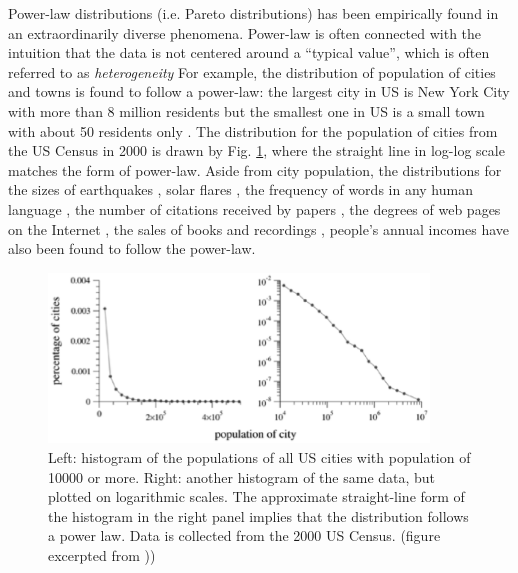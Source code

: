 Power-law distributions (i.e. Pareto distributions) has been empirically found in an extraordinarily diverse phenomena. Power-law is often connected with the intuition that the data is not centered around a ``typical value'', which is often referred to as \textit{heterogeneity}  For example, the distribution of population of cities and towns is found to follow a power-law: the largest city in US is New York City with more than 8 million residents but the smallest one in US is a small town with about 50 residents only \cite{newman2005power}. The distribution for the population of cities from the US Census in 2000 is drawn by Fig. \ref{fig:ch2_population}, where the straight line in log-log scale matches the form of power-law. Aside from city population, the distributions for the sizes of earthquakes \cite{gutenberg1942earthquake}, solar flares \cite{lu1991avalanches}, the frequency of words in any human language \cite{zipf1949human}, the number of citations received by papers \cite{de1965networks}, the degrees of web pages on the Internet \cite{barabasi1999emergence,faloutsos1999power}, the sales of books and recordings \cite{cox1995concentration}, people's annual incomes \cite{pareto1964cours} have also been found to follow the power-law. 

\begin{figure}[!h]
\begin{center}
\includegraphics[width=0.9\textwidth]{figures/ch2_population.eps}
\caption{Left: histogram of the populations of all US cities with population of 10000 or more. Right: another histogram of the same data, but plotted on logarithmic scales. The approximate straight-line form of the histogram in the right panel implies that the distribution follows a power law. Data is collected from the 2000 US Census. (figure excerpted from \cite{newman2005power}))}
\label{fig:ch2_population}
\end{center}
\end{figure}

